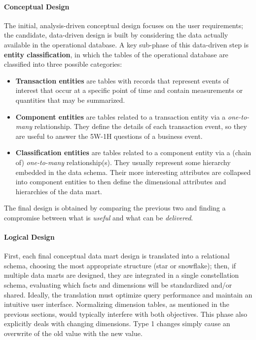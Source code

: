 \paragraph{Conceptual Design}

The initial, analysis-driven conceptual design focuses on the user requirements; the candidate, data-driven design is built by considering the data actually available in the operational database. A key sub-phase of this data-driven step is \textbf{entity classification}, in which the tables of the operational database are classified into three possible categories:
\begin{itemize}
    \item \textbf{Transaction entities} are tables with records that represent events of interest that occur at a specific point of time and contain measurements or quantities that may be summarized.
    \item \textbf{Component entities} are tables related to a transaction entity via a \textit{one-to-many} relationship. They define the details of each transaction event, so they are useful to answer the 5W-1H questions of a business event.
    \item \textbf{Classification entities} are tables related to a component entity via a (chain of) \textit{one-to-many} relationship(s). They usually represent some hierarchy embedded in the data schema. Their more interesting attributes are collapsed into component entities to then define the dimensional attributes and hierarchies of the data mart.
\end{itemize}
The final design is obtained by comparing the previous two and finding a compromise between what is \textit{useful} and what can be \textit{delivered}.

\paragraph{Logical Design} First, each final conceptual data mart design is translated into a relational schema, choosing the most appropriate structure (star or snowflake); then, if multiple data marts are designed, they are integrated in a single constellation schema, evaluating which facts and dimensions will be standardized and/or shared. Ideally, the translation must optimize query performance and maintain an intuitive user interface. Normalizing dimension tables, as mentioned in the previous sections, would typically interfere with both objectives. This phase also explicitly deals with changing dimensions. Type 1 changes simply cause an overwrite of the old value with the new value.

